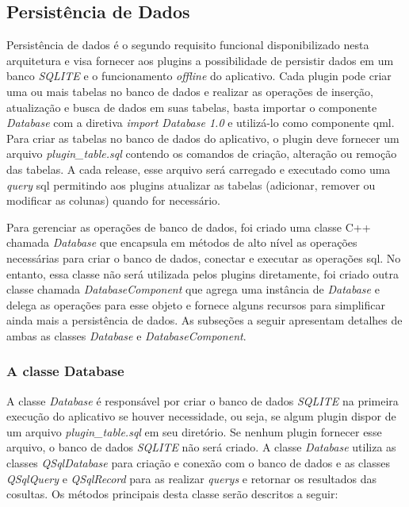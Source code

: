 \subsection{Persistência de Dados}\label{sec:solucao-desenvolvida}
Persistência de dados é o segundo requisito funcional disponibilizado nesta arquitetura e visa fornecer aos plugins a possibilidade de persistir dados em um banco \textit{SQLITE} e o funcionamento \textit{offline} do aplicativo. Cada plugin pode criar uma ou mais tabelas no banco de dados e realizar as operações de inserção, atualização e busca de dados em suas tabelas, basta importar o componente \textit{Database} com a diretiva \textit{import Database 1.0} e utilizá-lo como componente qml. Para criar as tabelas no banco de dados do aplicativo, o plugin deve fornecer um arquivo \textit{plugin\_table.sql} contendo os comandos de criação, alteração ou remoção das tabelas. A cada release, esse arquivo será carregado e executado como uma \textit{query} sql permitindo aos plugins atualizar as tabelas (adicionar, remover ou modificar as colunas) quando for necessário.\par

Para gerenciar as operações de banco de dados, foi criado uma classe C++ chamada \textit{Database} que encapsula em métodos de alto nível as operações necessárias para criar o banco de dados, conectar e executar as operações sql. No entanto, essa classe não será utilizada pelos plugins diretamente, foi criado outra classe chamada \textit{DatabaseComponent} que agrega uma instância de \textit{Database} e delega as operações para esse objeto e fornece alguns recursos para simplificar ainda mais a persistência de dados. As subseções a seguir apresentam detalhes de ambas as classes \textit{Database} e \textit{DatabaseComponent}.

\subsubsection{A classe Database}\label{sec:solucao-desenvolvida}
A classe \textit{Database} é responsável por criar o banco de dados \textit{SQLITE} na primeira execução do aplicativo se houver necessidade, ou seja, se algum plugin dispor de um arquivo \textit{plugin\_table.sql} em seu diretório. Se nenhum plugin fornecer esse arquivo, o banco de dados \textit{SQLITE} não será criado. A classe \textit{Database} utiliza as classes \textit{QSqlDatabase} para criação e conexão com o banco de dados e as classes \textit{QSqlQuery} e \textit{QSqlRecord} para as realizar \textit{querys} e retornar os resultados das cosultas. Os métodos principais desta classe serão descritos a seguir:

